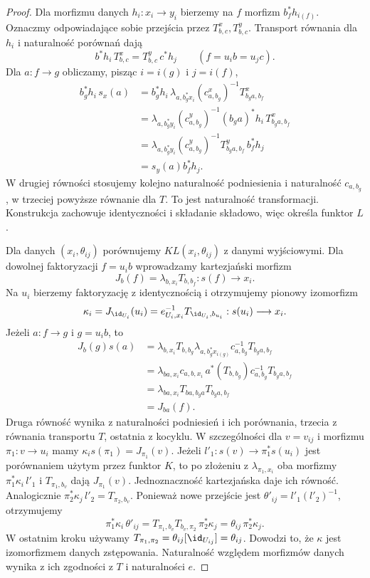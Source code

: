 \begin{proof}
Dla morfizmu danych $h_i:x_i\to y_i$ bierzemy na $f$ morfizm $b_f^*h_{i(f)}$. Oznaczmy odpowiadające sobie przejścia przez $T^x_{b,c},T^y_{b,c}$. Transport równania dla $h_i$ i naturalność porównań dają
\[
 b^*h_i\,T^x_{b,c}=T^y_{b,c}\,c^*h_j
 \qquad(f=u_i b=u_j c).
\]
Dla $a:f\to g$ obliczamy, pisząc $i=i(g)$ i $j=i(f)$,
\[
\begin{aligned}
 b_g^*h_i\,s_x(a)
 &=b_g^*h_i\,\lambda_{a,b_g^*x_i}
       (c^x_{a,b_g})^{-1}T^x_{b_ga,b_f}\\
 &=\lambda_{a,b_g^*y_i}(c^y_{a,b_g})^{-1}
       (b_ga)^*h_i\,T^x_{b_ga,b_f}\\
 &=\lambda_{a,b_g^*y_i}(c^y_{a,b_g})^{-1}
       T^y_{b_ga,b_f}\,b_f^*h_j\\
 &=s_y(a)b_f^*h_j.
\end{aligned}
\]
W drugiej równości stosujemy kolejno naturalność podniesienia i naturalność $c_{a,b_g}$, w trzeciej powyższe równanie dla $T$. To jest naturalność transformacji. Konstrukcja zachowuje identyczności i składanie składowo, więc określa funktor $L$.

Dla danych $(x_i,\theta_{ij})$ porównujemy $K L(x_i,\theta_{ij})$ z danymi wyjściowymi. Dla dowolnej faktoryzacji $f=u_i b$ wprowadzamy kartezjański morfizm
\[
 J_b(f)=\lambda_{b,x_i}T_{b,b_f}:s(f)\longrightarrow x_i.
\]
Na $u_i$ bierzemy faktoryzację z identycznością i otrzymujemy pionowy izomorfizm
\[
 \kappa_i=J_{\id_{U_i}}(u_i)=e_{U_i,x_i}^{-1}T_{\id_{U_i},b_{u_i}}
 :s(u_i)\longrightarrow x_i.
\]
Jeżeli $a:f\to g$ i $g=u_i b$, to
\[
\begin{aligned}
 J_b(g)s(a)
 &=\lambda_{b,x_i}T_{b,b_g}
   \lambda_{a,b_g^*x_{i(g)}}c_{a,b_g}^{-1}T_{b_ga,b_f}\\
 &=\lambda_{ba,x_i}c_{a,b,x_i}\,
   a^*(T_{b,b_g})c_{a,b_g}^{-1}T_{b_ga,b_f}\\
 &=\lambda_{ba,x_i}T_{ba,b_ga}T_{b_ga,b_f}\\
 &=J_{ba}(f).
\end{aligned}
\]
Druga równość wynika z naturalności podniesień i ich porównania, trzecia z równania transportu $T$, ostatnia z kocyklu. W szczególności dla $v=v_{ij}$ i morfizmu $\pi_1:v\to u_i$ mamy $\kappa_i s(\pi_1)=J_{\pi_1}(v)$. Jeżeli $l'_1:s(v)\to\pi_1^*s(u_i)$ jest porównaniem użytym przez funktor $K$, to po złożeniu z $\lambda_{\pi_1,x_i}$ oba morfizmy $\pi_1^*\kappa_i\,l'_1$ i $T_{\pi_1,b_v}$ dają $J_{\pi_1}(v)$. Jednoznaczność kartezjańska daje ich równość. Analogicznie $\pi_2^*\kappa_j\,l'_2=T_{\pi_2,b_v}$. Ponieważ nowe przejście jest $\theta'_{ij}=l'_1(l'_2)^{-1}$, otrzymujemy
\[
 \pi_1^*\kappa_i\,\theta'_{ij}
 =T_{\pi_1,b_v}T_{b_v,\pi_2}\,\pi_2^*\kappa_j
 =\theta_{ij}\,\pi_2^*\kappa_j.
\]
W ostatnim kroku używamy $T_{\pi_1,\pi_2}=\theta_{ij}[\id_{U_{ij}}]=\theta_{ij}$. Dowodzi to, że $\kappa$ jest izomorfizmem danych zstępowania. Naturalność względem morfizmów danych wynika z ich zgodności z $T$ i naturalności $e$.


\end{proof}
